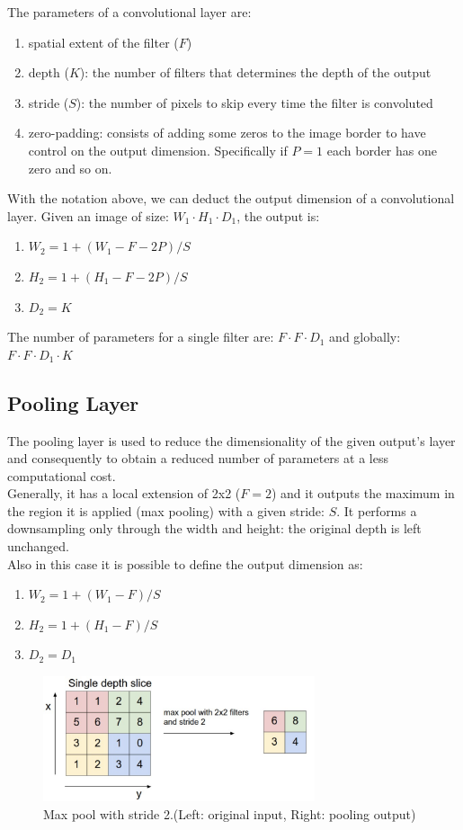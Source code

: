 \documentclass[LaM,binding=0.6cm]{sapthesis}
\begin{document}
The parameters of a convolutional layer are:
\begin{enumerate}
\item spatial extent of the filter ($F$)
\item depth ($K$): the number of filters that determines the depth of the output
\item stride ($S$): the number of pixels to skip every time the filter is convoluted
\item zero-padding: consists of adding some zeros to the image border to have control on the output dimension. Specifically if $P=1$ each border has one zero and so on.
\end{enumerate}
With the notation above, we can deduct the output dimension of a convolutional layer. Given an image of size: $W_1 \cdot H_1 \cdot D_1$, the output is:
\begin{enumerate}
\item $W_2 = 1+(W_1-F-2P)/S$
\item $H_2 = 1+(H_1-F-2P)/S$
\item $D_2 = K$
\end{enumerate} 
The number of parameters for a single filter are: $F\cdot F\cdot D_1$ and globally: $F\cdot F\cdot D_1\cdot K$
\subsection{Pooling Layer}
The pooling layer is used to reduce the dimensionality of the given output's layer and consequently to obtain a reduced number of parameters at a less computational cost.\\Generally, it has a local extension of 2x2 ($F=2$) and it outputs the maximum in the region it is applied (max pooling) with a given stride: $S$. It performs a downsampling only through the width and height: the original depth is left unchanged.\\Also in this case it is possible to define the output dimension as:
\begin{enumerate}
\item $W_2 = 1+(W_1-F)/S$
\item $H_2 = 1+(H_1-F)/S$
\item $D_2 = D_1$
\end{enumerate} 
\begin{figure}[H]  \centering
    \includegraphics[width=80mm,scale=0.7]{pool}
    \caption{Max pool with stride 2.(Left: original input, Right: pooling output) \cite{cnnsite}}
    \label{fig:pool}
\end{figure}
\end{document}
